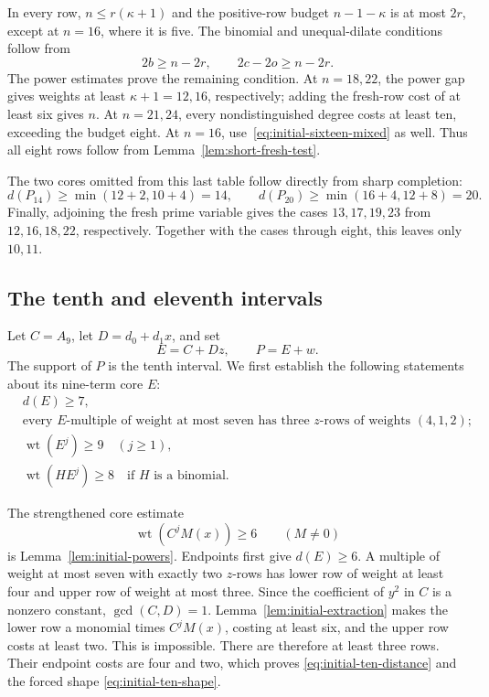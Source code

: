 \documentclass[11pt]{article}
\DeclareMathOperator{\wt}{wt}\DeclareMathOperator{\ord}{ord}
\numberwithin{equation}{section}
\theoremstyle{definition}\newtheorem{definition}[theorem]{Definition}
\theoremstyle{remark}\newtheorem{remark}[theorem]{Remark}
\begin{document}
In every row, $n\le r(\kappa+1)$ and the positive-row budget
$n-1-\kappa$ is at most $2r$, except at $n=16$, where it is five.
The binomial and unequal-dilate conditions follow from
\[
 2b\ge n-2r,\qquad 2c-2o\ge n-2r.
\]
The power estimates prove the remaining condition. At $n=18,22$,
the power gap gives weights at least $\kappa+1=12,16$, respectively;
adding the fresh-row cost of at least six gives $n$. At $n=21,24$, every nondistinguished degree
costs at least ten, exceeding the budget eight.
At $n=16$, use~\eqref{eq:initial-sixteen-mixed} as well.
Thus all eight rows follow from Lemma~\ref{lem:short-fresh-test}.

The two cores omitted from this last table follow directly from sharp
completion:
\[
 d(P_{14})\ge\min(12+2,10+4)=14,\qquad
 d(P_{20})\ge\min(16+4,12+8)=20.
\]
Finally, adjoining the fresh prime variable gives the cases
$13,17,19,23$ from $12,16,18,22$, respectively. Together with the
cases through eight, this leaves only $10,11$.

\subsection{The tenth and eleventh intervals}

Let $C=A_9$, let $D=d_0+d_1x$, and set
\[
 E=C+Dz,\qquad P=E+w.
\]
The support of $P$ is the tenth interval.  We first establish the
following statements about its nine-term core $E$:
\begin{align}
 &d(E)\geq7,\label{eq:initial-ten-distance}\\
 &\text{every $E$-multiple of weight at most seven has three $z$-rows
 of weights $(4,1,2)$;}\label{eq:initial-ten-shape}\\
 &\wt(E^j)\geq9\quad(j\geq1),\label{eq:initial-ten-power}\\
 &\wt(HE^j)\geq8\quad\text{if $H$ is a binomial.}
 \label{eq:initial-ten-binomial}
\end{align}

The strengthened core estimate
\[
 \wt(C^jM(x))\geq6\qquad(M\ne0)
\]
is Lemma~\ref{lem:initial-powers}.  Endpoints first give $d(E)\geq6$.
A multiple of weight at most seven with exactly two $z$-rows has lower
row of weight at least four and upper row of weight at most three.
Since the coefficient of $y^2$ in $C$ is a nonzero constant,
$\gcd(C,D)=1$.  Lemma~\ref{lem:initial-extraction} makes the lower row
a monomial times $C^jM(x)$, costing at least six, and the upper row
costs at least two.  This is impossible.  There are therefore at least
three rows.  Their endpoint costs are four and two, which proves
\eqref{eq:initial-ten-distance} and the forced shape
\eqref{eq:initial-ten-shape}.
\end{document}
